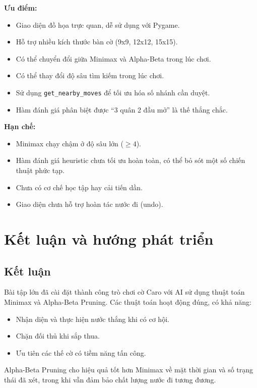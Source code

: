 \documentclass[12pt,a4paper]{article}
\begin{document}
\textbf{Ưu điểm:}
\begin{itemize}
    \item Giao diện đồ họa trực quan, dễ sử dụng với Pygame.
    \item Hỗ trợ nhiều kích thước bàn cờ (9x9, 12x12, 15x15).
    \item Có thể chuyển đổi giữa Minimax và Alpha-Beta trong lúc chơi.
    \item Có thể thay đổi độ sâu tìm kiếm trong lúc chơi.
    \item Sử dụng \texttt{get\_nearby\_moves} để tối ưu hóa số nhánh cần duyệt.
    \item Hàm đánh giá phân biệt được ``3 quân 2 đầu mở'' là thế thắng chắc.
\end{itemize}

\textbf{Hạn chế:}
\begin{itemize}
    \item Minimax chạy chậm ở độ sâu lớn ($\geq 4$).
    \item Hàm đánh giá heuristic chưa tối ưu hoàn toàn, có thể bỏ sót một số chiến thuật phức tạp.
    \item Chưa có cơ chế học tập hay cải tiến dần.
    \item Giao diện chưa hỗ trợ hoàn tác nước đi (undo).
\end{itemize}

\section{Kết luận và hướng phát triển}

\subsection{Kết luận}

Bài tập lớn đã cài đặt thành công trò chơi cờ Caro với AI sử dụng thuật toán Minimax và Alpha-Beta Pruning. Các thuật toán hoạt động đúng, có khả năng:
\begin{itemize}
    \item Nhận diện và thực hiện nước thắng khi có cơ hội.
    \item Chặn đối thủ khi sắp thua.
    \item Ưu tiên các thế cờ có tiềm năng tấn công.
\end{itemize}

Alpha-Beta Pruning cho hiệu quả tốt hơn Minimax về mặt thời gian và số trạng thái đã xét, trong khi vẫn đảm bảo chất lượng nước đi tương đương.
\end{document}
